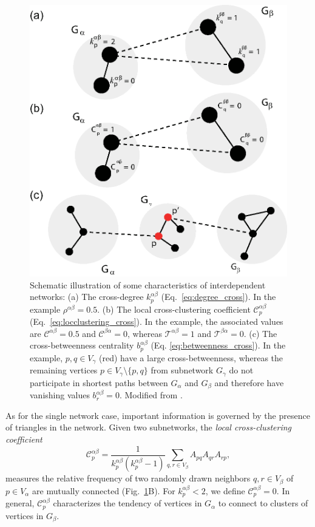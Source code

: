 \begin{figure}
	\centering
	\includegraphics[scale=0.8]{Chapter02_CompNetworkT/cross_measures_schematic.eps} 
\caption{Schematic illustration of some characteristics of interdependent networks: (a) The cross-degree $k_p^{\alpha\beta}$ (Eq.~\eqref{eq:degree_cross}). In the example $\rho^{\alpha\beta}=0.5$. (b) The local cross-clustering coefficient $\mathcal{C}_p^{\alpha\beta}$ (Eq.~\eqref{eq:locclustering_cross}). In the example, the associated values are $\mathcal{C}^{\alpha\beta}=0.5$ and $\mathcal{C}^{\beta\alpha}=0$, whereas $\mathcal{T}^{\alpha\beta}=1$ and $\mathcal{T}^{\beta\alpha}=0$. (c) The cross-betweenness centrality $b_p^{\alpha\beta}$ (Eq. \eqref{eq:betweenness_cross}). In the example, $p,q\in V_\gamma$ (red) have a large cross-betweenness, whereas the remaining vertices $p\in V_\gamma\setminus\{p,q\}$ from subnetwork $G_\gamma$ do not participate in shortest paths between $G_\alpha$ and $G_\beta$ and therefore have vanishing values $b_r^{\alpha\beta}=0$. Modified from \cite{Donges2012PhD,Donges2011b}. } \label{fig:interacting_measures}
\end{figure}

		As for the single network case, important information is governed by the presence of triangles in the network. Given two subnetworks, the \textit{local cross-clustering coefficient}
\begin{equation}
{\mathcal{C}}_p^{\alpha\beta} = \frac{1}{{k}_p^{\alpha\beta}({k}_p^{\alpha\beta} - 1)} \sum_{q,r \in V_\beta} A_{pq} A_{qr} A_{rp},
\label{eq:locclustering_cross}
\end{equation}
\noindent
measures the relative frequency of two randomly drawn neighbors $q,r\in V_\beta$ of $p\in V_\alpha$ are mutually connected (Fig.~\ref{fig:interacting_measures}B). For ${k}_p^{\alpha\beta}<2$, we define ${\mathcal{C}}_p^{\alpha\beta}=0$. In general, ${\mathcal{C}}_p^{\alpha\beta}$ characterizes the tendency of vertices in $G_\alpha$ to connect to clusters of vertices in $G_\beta$. 

